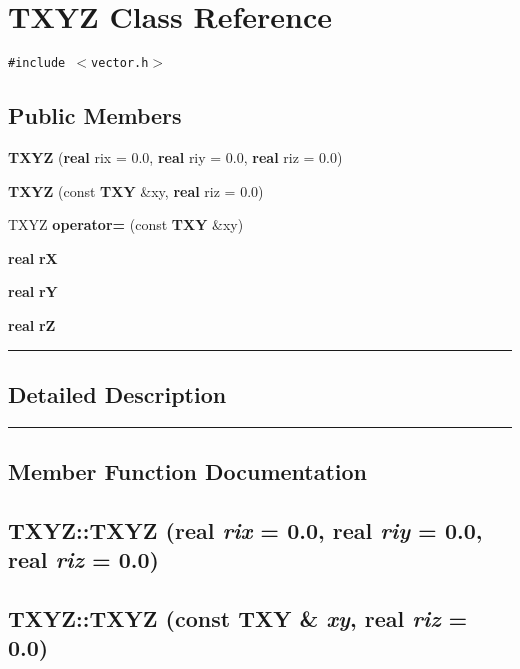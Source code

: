\section{TXYZ  Class Reference}
\label{TXYZ}


{\tt \#include $<$vector.h$>$}

\subsection*{Public Members}
\begin{CompactItemize}
\item 
{\bf TXYZ} ({\bf real} rix = 0.0, {\bf real} riy = 0.0, {\bf real} riz = 0.0)
\item 
{\bf TXYZ} (const {\bf TXY} \&xy, {\bf real} riz = 0.0)
\item 
TXYZ {\bf operator=} (const {\bf TXY} \&xy)
\item 
{\bf real} {\bf r\-X}
\item 
{\bf real} {\bf r\-Y}
\item 
{\bf real} {\bf r\-Z}
\end{CompactItemize}
\vspace{0.4cm}\hrule\vspace{0.2cm}
\subsection*{Detailed Description}
\vspace{0.4cm}\hrule\vspace{0.2cm}
\subsection*{Member Function Documentation}
\label{TXYZ_a0}
\subsection{\setlength{\rightskip}{0pt plus 5cm}TXYZ::TXYZ ({\bf real} {\em rix} = 0.0, {\bf real} {\em riy} = 0.0, {\bf real} {\em riz} = 0.0)\hspace{0.3cm}{\tt  [inline]}}

\label{TXYZ_a1}
\subsection{\setlength{\rightskip}{0pt plus 5cm}TXYZ::TXYZ (const {\bf TXY} \& {\em xy}, {\bf real} {\em riz} = 0.0)\hspace{0.3cm}{\tt  [inline]}}

